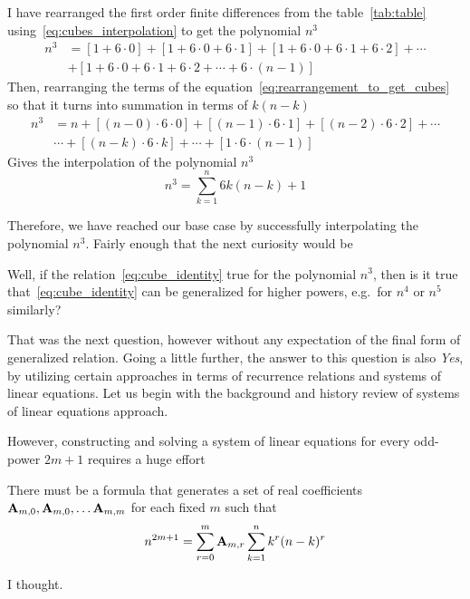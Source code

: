 I have rearranged the first order finite differences from the table~\eqref{tab:table} using~\eqref{eq:cubes_interpolation}
to get the polynomial $n^3$
\begin{align}
    \label{eq:rearrangement_to_get_cubes}
    n^3 &= [1+6\cdot0]+[1+6\cdot0+6\cdot1]+[1+6\cdot0+6\cdot1+6\cdot2]+\cdots \nonumber \\
    &+[1+6\cdot0+6\cdot1+6\cdot2+\cdots+6\cdot(n-1)]
\end{align}
Then, rearranging the terms of the equation~\eqref{eq:rearrangement_to_get_cubes} so that it turns into summation
in terms of $k (n-k)$
\begin{equation*}
    \begin{split}
        n^3 &= n + [(n-0) \cdot 6 \cdot 0] + [(n-1)\cdot6\cdot1] + [(n-2)\cdot6\cdot2] + \cdots \\
        &\cdots + [(n-k)\cdot 6 \cdot k] + \cdots + [1\cdot6\cdot(n-1)]
    \end{split}
\end{equation*}
Gives the interpolation of the polynomial $n^3$
\begin{equation}
    \label{eq:cube_identity}
    n^3 = \sum_{k=1}^{n} 6k(n-k) + 1
\end{equation}

Therefore, we have reached our base case by successfully interpolating the polynomial $n^3$.
Fairly enough that the next curiosity would be
\begin{question}
    Well, if the relation~\eqref{eq:cube_identity} true for the polynomial $n^3$,
    then is it true that~\eqref{eq:cube_identity} can be generalized for higher powers, e.g.\ for $n^4$ or $n^5$ similarly?
    \label{question:higher_powers}
\end{question}
That was the next question, however without any expectation of the final form of generalized relation.
Going a little further, the answer to this question is also \textit{Yes}, by utilizing certain approaches
in terms of recurrence relations and systems of linear equations.
Let us begin with the background and history review of systems of linear equations approach.



However, constructing and solving a system of linear equations for every odd-power $2m+1$ requires a huge effort
\begin{assumption}
    There must be a formula that generates a set of real coefficients ${\mathbf{A}} \sb{m,0},{\mathbf{A}} \sb{m,0}, \dots {\mathbf{A}} \sb{m,m}$
    for each fixed $m$ such that
    \begin{align*}
        n^{2m+1} = \sum_{r=0}^{m} {\mathbf{A}} \sb{m,r} \sum_{k=1}^{n} k^{r} (n-k)^{r}
    \end{align*}
\end{assumption}
I thought.

